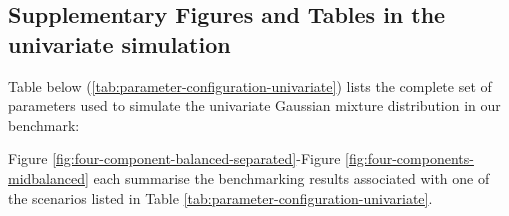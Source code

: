 \newpage

\hypertarget{supplementary-figures-and-tables-in-the-univariate-simulation}{%
\subsection{Supplementary Figures and Tables in the univariate simulation}\label{supplementary-figures-and-tables-in-the-univariate-simulation}}

Table below (\ref{tab:parameter-configuration-univariate}) lists the complete set of parameters used to simulate the univariate Gaussian mixture distribution in our benchmark:

\begin{table}[!h]

\caption{\label{tab:parameter-configuration-univariate}The 9 parameter configurations tested to generate the samples of the univariate experiment, with $k=4$ components.}
\centering
{}
\end{table}

Figure \ref{fig:four-component-balanced-separated}-Figure
\ref{fig:four-components-midbalanced} each summarise the benchmarking
results associated with one of the scenarios listed in Table
\ref{tab:parameter-configuration-univariate}.

